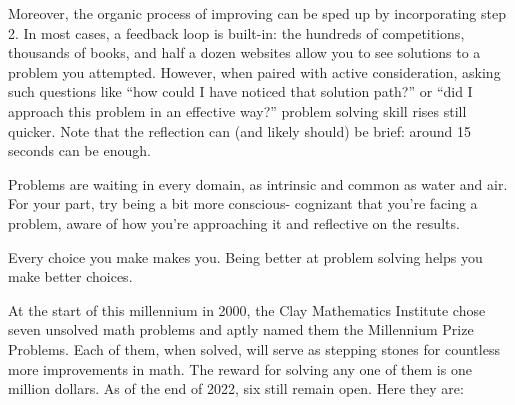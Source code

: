 \documentclass{article}
\begin{document}
\begin{multicols}{3}
Moreover, the organic process of improving can be sped up by incorporating step 2. In most cases, a feedback loop is built-in: the hundreds of competitions, thousands of books, and half a dozen websites allow you to see solutions to a problem you attempted. However, when paired with active consideration, asking such questions like “how could I have noticed that solution path?” or “did I approach this problem in an effective way?” problem solving skill rises still quicker. Note that the reflection can (and likely should) be brief: around 15 seconds can be enough. 

Problems are waiting in every domain, as intrinsic and common as water and air. For your part, try being a bit more conscious- cognizant that you’re facing a problem, aware of how you’re approaching it and reflective on the results.

Every choice you make makes you. Being better at problem solving helps you make better choices.
\closearticle

At the start of this millennium in 2000, the Clay Mathematics Institute chose seven unsolved math problems and aptly named them the Millennium Prize Problems. Each of them, when solved, will serve as stepping stones for countless more improvements in math. The reward for solving any one of them is one million dollars. As of the end of 2022, six still remain open. Here they are:


\end{multicols}
\end{document}
